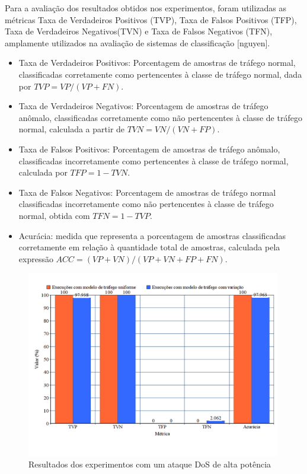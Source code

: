\documentclass[cic,tc]{iiufrgs}
\begin{document}
Para a avaliação dos resultados obtidos nos experimentos, foram utilizadas as métricas Taxa de Verdadeiros Positivos (TVP),  Taxa de Falsos Positivos (TFP), Taxa de Verdadeiros Negativos(TVN) e Taxa de Falsos Negativos (TFN), amplamente utilizados na avaliação de sistemas de classificação [nguyen].
\begin{itemize}
\item{Taxa de Verdadeiros Positivos}: Porcentagem de amostras de tráfego normal, classificadas corretamente como pertencentes à classe de tráfego normal, dada por $TVP = VP / (VP + FN)$.
\item{Taxa de Verdadeiros Negativos}: Porcentagem de amostras de tráfego anômalo, classificadas corretamente como não pertencentes à classe de tráfego normal, calculada a partir de $TVN = VN / (VN + FP)$.
\item{Taxa de Falsos Positivos}: Porcentagem de amostras de tráfego anômalo, classificadas incorretamente como pertencentes à classe de tráfego normal, calculada por $TFP = 1 - TVN$.
\item{Taxa de Falsos Negativos}: Porcentagem de amostras de tráfego normal classificadas incorretamente como não pertencentes à classe de tráfego normal, obtida com $TFN = 1 - TVP$.
\item{Acurácia}: medida que representa a porcentagem de amostras classificadas corretamente em relação à quantidade total de amostras, calculada pela expressão $ACC = (VP + VN) / (VP + VN + FP + FN)$.
\end{itemize}

\begin{figure}[h]
   \caption{Resultados dos experimentos com um ataque DoS de alta potência}
   \begin{center}
       \includegraphics[width=30em]{chartdos1}
   \end{center}
   \label{chartdos1}
\end{figure}
\end{document}
